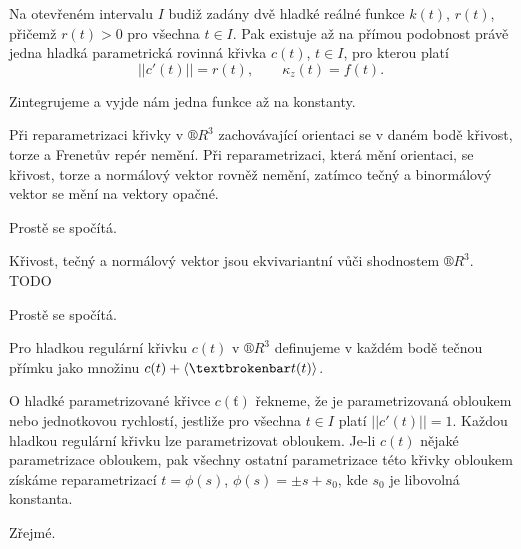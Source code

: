 \documentclass[12pt]{article}					%
\begin{document}

	\begin{veta}
		Na otevřeném intervalu $I$ budiž zadány dvě hladké reálné funkce $k(t)$, $r(t)$, přičemž $r(t) > 0$ pro všechna $t \in I$. Pak existuje až na přímou podobnost právě jedna hladká parametrická rovinná křivka $c(t)$, $t \in I$, pro kterou platí
		$$ ||c'(t)|| = r(t), \qquad \kappa_z(t) = f(t). $$

		\begin{dukazin}
			Zintegrujeme a vyjde nám jedna funkce až na konstanty.
		\end{dukazin}
	\end{veta}

	\begin{veta}
		Při reparametrizaci křivky v $®R^3$ zachovávající orientaci se v daném bodě křivost, torze a Frenetův repér nemění. Při reparametrizaci, která mění orientaci, se křivost, torze a normálový vektor rovněž nemění, zatímco tečný a binormálový vektor se mění na vektory opačné.

		\begin{dukazin}
			Prostě se spočítá.
		\end{dukazin}
	\end{veta}

	\begin{veta}
		Křivost, tečný a normálový vektor jsou ekvivariantní vůči shodnostem $®R^3$. TODO

		\begin{dukazin}
			Prostě se spočítá.
		\end{dukazin}
	\end{veta}

	\begin{definice}[Tečna]
		Pro hladkou regulární křivku $c(t)$ v $®R^3$ definujeme v každém bodě tečnou přímku jako množinu $c(t) + \<¦t(t)\>$.
	\end{definice}

	\begin{definice}
		O hladké parametrizované křivce $c(ť)$ řekneme, že je parametrizovaná obloukem nebo jednotkovou rychlostí, jestliže pro všechna $t \in I$ platí $||c'(t)|| = 1$. Každou hladkou regulární křivku lze parametrizovat obloukem. Je-li $c(t)$ nějaké parametrizace obloukem, pak všechny ostatní parametrizace této křivky obloukem získáme reparametrizací $t = \phi(s)$, $\phi(s) = ±s + s_0$, kde $s_0$ je libovolná konstanta.
		
		\begin{dukazin}
			Zřejmé.
		\end{dukazin}
	\end{definice}
\end{document}
